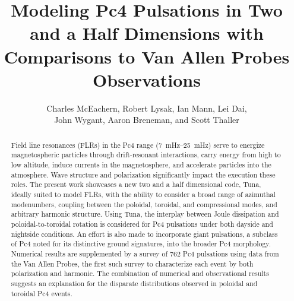 \documentclass{article}
\begin{document}
\title{Modeling Pc4 Pulsations in Two and a Half Dimensions with Comparisons to Van Allen Probes Observations}

\author{
    Charles McEachern,
    Robert Lysak,
    Ian Mann,
    Lei Dai, \\
    John Wygant,
    Aaron Breneman, and
    Scott Thaller
}




\maketitle


\begin{abstract}

Field line resonances (FLRs) in the Pc4 range (\SIrange{7}{25}{\mHz}) serve to energize magnetospheric particles through drift-resonant interactions, carry energy from high to low altitude, induce currents in the magnetosphere, and accelerate particles into the atmosphere. Wave structure and polarization significantly impact the execution these roles. The present work showcases a new two and a half dimensional code, Tuna, ideally suited to model FLRs, with the ability to consider a broad range of azimuthal modenumbers, coupling between the poloidal, toroidal, and compressional modes, and arbitrary harmonic structure. Using Tuna, the interplay between Joule dissipation and poloidal-to-toroidal rotation is considered for Pc4 pulsations under both dayside and nightside conditions. An effort is also made to incorporate giant pulsations, a subclass of Pc4 noted for its distinctive ground signatures, into the broader Pc4 morphology. Numerical results are supplemented by a survey of 762 Pc4 pulsations using data from the Van Allen Probes, the first such survey to characterize each event by both polarization and harmonic. The combination of numerical and observational results suggests an explanation for the disparate distributions observed in poloidal and toroidal Pc4 events.

\end{abstract}
\end{document}
